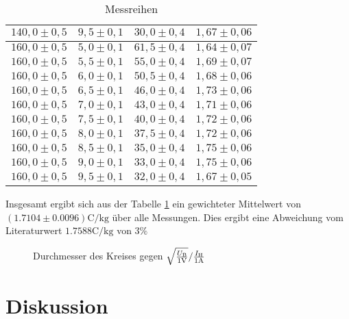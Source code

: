 \documentclass[12pt,a4paper,titlepage,headinclude,bibtotoc]{scrartcl}
\begin{document}
\begin{table}[h!]
\begin{tabular}{|l|l|l|l|}
		 \hline                         
		 $140,0 \pm 0,5$ & $9,5 \pm 0,1$& $30,0 \pm 0,4$ & $1,67 \pm 0,06$\\
		 \hline                         
		 $160,0 \pm 0,5$ & $5,0 \pm 0,1$& $61,5 \pm 0,4$ & $1,64 \pm 0,07$\\
		 \hline                         
		 $160,0 \pm 0,5$ & $5,5 \pm 0,1$& $55,0 \pm 0,4$ & $1,69 \pm 0,07$\\
		 \hline                         
		 $160,0 \pm 0,5$ & $6,0 \pm 0,1$& $50,5 \pm 0,4$ & $1,68 \pm 0,06$\\
		 \hline                         
		 $160,0 \pm 0,5$ & $6,5 \pm 0,1$& $46,0 \pm 0,4$ & $1,73 \pm 0,06$\\
		 \hline                         
		 $160,0 \pm 0,5$ & $7,0 \pm 0,1$& $43,0 \pm 0,4$ & $1,71 \pm 0,06$\\
		 \hline                         
		 $160,0 \pm 0,5$ & $7,5 \pm 0,1$& $40,0 \pm 0,4$ & $1,72 \pm 0,06$\\
		 \hline                         
		 $160,0 \pm 0,5$ & $8,0 \pm 0,1$& $37,5 \pm 0,4$ & $1,72 \pm 0,06$\\
		 \hline                         
		 $160,0 \pm 0,5$ & $8,5 \pm 0,1$& $35,0 \pm 0,4$ & $1,75 \pm 0,06$\\
		 \hline                         
		 $160,0 \pm 0,5$ & $9,0 \pm 0,1$& $33,0 \pm 0,4$ & $1,75 \pm 0,06$\\
		 \hline                         
		 $160,0 \pm 0,5$ & $9,5 \pm 0,1$& $32,0 \pm 0,4$ & $1,67 \pm 0,05$\\
		  \hline
	  \end{tabular}
	  \caption{Messreihen}
	  \label{tbl:pythonmessung}
  \end{table}
Insgesamt ergibt sich aus der Tabelle \ref{tbl:pythonmessung} ein gewichteter Mittelwert von $(1.7104 \pm 0.0096)\si{\coulomb/\kilo\gram}$ über alle Messungen.
Dies ergibt eine Abweichung vom Literaturwert $1.7588\si{\coulomb/\kilo\gram}$ von $3\%$

\begin{figure}[!h]
	\centering
	
	\caption{Durchmesser des Kreises gegen $\sqrt{\frac{U_\text{B}}{1\text V}}/\frac{I_\text{H}}{1\text A}$}
	\label{fig:eric}
\end{figure}


\section{Diskussion}
\label{sec:diskussion}


\end{document}
